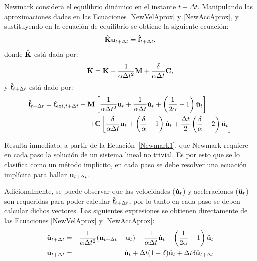 Newmark considera el equilibrio dinámico en el instante $t+\Delta t$. %
%
Manipulando las aproximaciones dadas en las Ecuaciones \eqref{NewVelAprox} y \eqref{NewAccAprox}, y sustituyendo en la ecuación de equilibrio se obtiene la siguiente ecuación:
%
\begin{equation}\label{Newmark1}
	\hat{{\bf K}} {\bf u}_{t+\Delta t} = \hat{{\bf f}}_{t+\Delta t},
\end{equation}
%
donde $\hat{{\bf K}}$ está dada por:
%
\begin{equation}\label{Newmark2}
	\hat{{\bf K}} = {\bf K} + \frac{1}{\alpha \Delta t^2} {\bf M} + \frac{\delta}{\alpha \Delta t} {\bf C},
\end{equation}
%
y  $\hat{{\bf f}}_{t+\Delta t}$ está dado por:
%
\begin{equation}
	\begin{split}
	\hat{{\bf f}}_{t+\Delta t} = {\bf f}_{\text{ext},t+\Delta t} + {\bf M} &\left[\frac{1}{\alpha \Delta t^2}{\bf u}_{t}+
	\frac{1}{\alpha \Delta t}\dot{{\bf u}}_{t}+\left(\frac{1}{2\alpha}-1\right)\ddot{{\bf u}}_{t}\right]\\
	+&{\bf C} \left[\frac{\delta}{\alpha \Delta t}{\bf u}_{t}+ \left(\frac{\delta}{\alpha}-1\right)\dot{{\bf u}}_{t}+\frac{\Delta t}{2}\left(\frac{\delta}{\alpha}-2\right)\ddot{{\bf u}}_{t}\right]
	\end{split}
\end{equation}

Resulta inmediato, a partir de la Ecuación~\eqref{Newmark1}, que Newmark requiere en cada paso la solución de un sistema lineal no trivial. %
%
Es por esto que se lo clasifica como un método implícito, en cada paso se debe resolver una ecuación implícita para hallar ${\bf u}_{t+\Delta t}$.

Adicionalmente, se puede observar que las velocidades ($\dot{{\bf u}}_t$) y aceleraciones ($\ddot{{\bf u}}_t$) son requeridas para poder calcular $\hat{{\bf f}}_{t+\Delta t}$, por lo tanto en cada paso se deben calcular dichos vectores. %
%
Las siguientes expresiones se obtienen directamente de las Ecuaciones \eqref{NewVelAprox} y \eqref{NewAccAprox}:
%
\begin{eqnarray}
	\ddot{{\bf u}}_{t+\Delta t} &=& \frac{1}{\alpha \Delta t^2}({\bf u}_{t+\Delta t}-{\bf u}_{t}) -
	\frac{1}{\alpha \Delta t}\dot{{\bf u}}_t  - \left(\frac{1}{2 \alpha}-1\right)\ddot{{\bf u}}_t\\
	\dot{{\bf u}}_{t+\Delta t} &=& \dot{{\bf u}}_t +\Delta t(1-\delta)\ddot{{\bf u}}_t +\Delta t \delta \ddot{{\bf u}}_{t+\Delta t}	\label{Newmark3}
\end{eqnarray}

